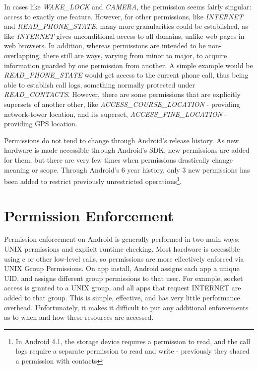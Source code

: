 In cases like \textit{WAKE\_LOCK} and \textit{CAMERA}, the permission seems fairly singular: access to exactly one feature. However, for other permissions, like \textit{INTERNET} and \textit{READ\_PHONE\_STATE}, many more granularities could be established, as like \textit{INTERNET} gives unconditional access to all domains, unlike web pages in web browsers. In addition, whereas permissions are intended to be non-overlapping, there still are ways, varying from minor to major, to acquire information guarded by one permission from another. A simple example would be \textit{READ\_PHONE\_STATE} would get access to the current phone call, thus being able to establish call logs, something normally protected under \textit{READ\_CONTACTS}. However, there are some permissions that are explicitly supersets of another other, like \textit{ACCESS\_COURSE\_LOCATION} - providing network-tower location, and its superset, \textit{ACCESS\_FINE\_LOCATION} - providing GPS location. 

Permissions do not tend to change through Android's release history. As new hardware is made accessible through Android's SDK, new permissions are added for them, but there are very few times when permissions drastically change meaning or scope. Through Android's 6 year history, only 3 new permissions has been added to restrict previously unrestricted operations\footnote{In Android 4.1, the storage device requires a permission to read, and the call logs require a separate permission to read and write - previously they shared a permission with contacts\citep{android41new}}.

\section{Permission Enforcement}
Permission enforcement on Android is generally performed in two main ways: UNIX permissions and explicit runtime checking. Most hardware is accessible using c or other low-level calls, so permissions are more effectively enforced via UNIX Group Permissions. On app install, Android assigns each app a unique UID, and assigns different group permissions to that user. For example, socket access is granted to a UNIX group, and all apps that request INTERNET are added to that group. This is simple, effective, and has very little performance overhead. Unfortunately, it makes it difficult to put any additional enforcements as to when and how these resources are accessed. 

